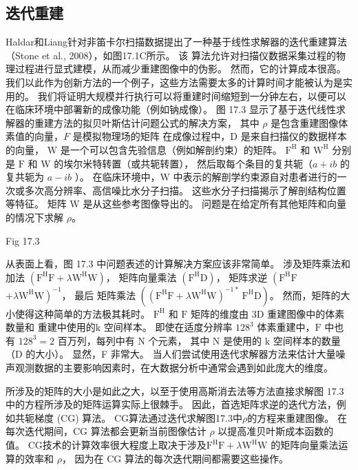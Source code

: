 \subsection{迭代重建}
Haldar和Liang针对非笛卡尔扫描数据提出了一种基于线性求解器的迭代重建算法（Stone et al., 2008），如图17.1C所示。 该
算法允许对扫描仪数据采集过程的物理过程进行显式建模，从而减少重建图像中的伪影。 然而，它的计算成本很高。 
我们以此作为创新方法的一个例子，这些方法需要太多的计算时间才能被认为是实用的。 
我们将证明大规模并行执行可以将重建时间缩短到一分钟左右，以便可以在临床环境中部署新的成像功能（例如钠成像）。 
图 17.3 显示了基于迭代线性求解器的重建方法的拟贝叶斯估计问题公式的解决方案，
其中 $\rho$ 是包含重建图像体素值的向量，$F$ 是模拟物理场的矩阵 在成像过程中，D 是来自扫描仪的数据样本的向量，
$\mathrm{W}$ 是一个可以包含先验信息（例如解剖约束）的矩阵。 
$\mathrm{F}^{\mathrm{H}}$ 和 $\mathrm{W}^{\mathrm{H}}$ 
分别是 $\mathrm{F}$ 和 $\mathrm{W}$ 的埃尔米特转置（或共轭转置），
然后取每个条目的复共轭（$a+i b$ 的复共轭为 $a-i b$ ）。 
在临床环境中，$\mathrm{W}$ 中表示的解剖学约束源自对患者进行的一次或多次高分辨率、高信噪比水分子扫描。 
这些水分子扫描揭示了解剖结构位置等特征。 矩阵 $\mathrm{W}$ 是从这些参考图像导出的。 
问题是在给定所有其他矩阵和向量的情况下求解 $\rho$。

{\color{red} Fig 17.3}

从表面上看，图 17.3 中问题表述的计算解决方案应该非常简单。 
涉及矩阵乘法和加法 $\left(\mathrm{F}^{\mathrm{H}} \mathrm{F}+\lambda \mathrm{W}^{\mathrm{H}} \mathrm{W}\right)$，
矩阵向量乘法 $\left(\mathrm{F}^{\mathrm{H}} \mathrm{D}\right)$，
矩阵求逆 $\left(\mathrm{F}^{\mathrm {H}} \mathrm{F}\right.$ $\left.+\lambda \mathrm{W}^{\mathrm{H}} \mathrm{W}\right)^{-1}$，
最后 矩阵乘法 $\left(\left(\mathrm{F}^{\mathrm{H}} \mathrm{F}+\lambda \mathrm{W}^{\mathrm{H}} \mathrm{W}\right )^{-1 *} \mathrm{~F}^{\mathrm{H}} \mathrm{D}\right)$。 
然而，矩阵的大小使得这种简单的方法极其耗时。 
$\mathrm{F}^{\mathrm{H}}$ 和 $\mathrm{F}$ 矩阵的维度由 $3 \mathrm{D}$ 重建图像中的体素数量和 重建中使用的$\mathrm{k}$ 空间样本。 
即使在适度分辨率 $128^{3}$ 体素重建中，$\mathrm{F}$ 中也有 $128^{3}=2$ 百万列，每列中有 $\mathrm{N}$ 个元素，
其中 $ \mathrm{N}$ 是使用的 $\mathrm{k}$ 空间样本的数量（D 的大小）。 显然，F 非常大。 
当人们尝试使用迭代求解器方法来估计大量噪声观测数据的主要影响因素时，在大数据分析中通常会遇到如此庞大的维度。

所涉及的矩阵的大小是如此之大，以至于使用高斯消去法等方法直接求解图 17.3 中的方程所涉及的矩阵运算实际上很棘手。 
因此，首选矩阵求逆的迭代方法，例如共轭梯度 (CG) 算法。 CG算法通过迭代求解图17.3中$\rho$的方程来重建图像。 
在每次迭代期间，CG 算法都会更新当前图像估计 $\rho$ 以提高准贝叶斯成本函数的值。 
CG技术的计算效率很大程度上取决于涉及$\mathrm{F}^{\mathrm{H}} \mathrm{F}+\lambda \mathrm{W}^{\mathrm{H}} \mathrm{W}$ 的矩阵向量乘法运算的效率和 $\rho$，
因为在 $\mathrm{CG}$ 算法的每次迭代期间都需要这些操作。

